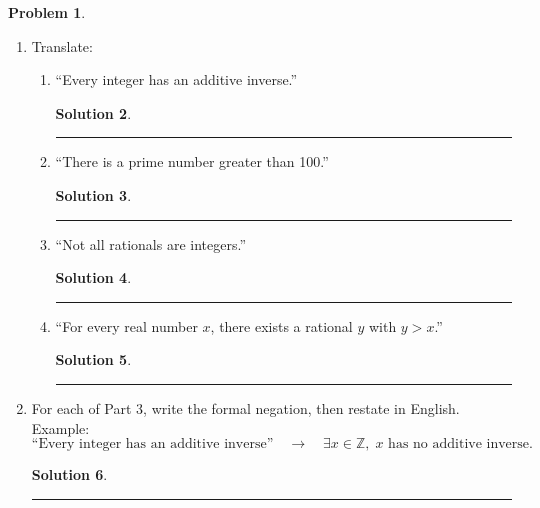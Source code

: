 \documentclass{article}
\theoremstyle{definition}
\newtheorem{problem}{Problem}
\def\fline{\rule{0.75\linewidth}{0.5pt}}
\newcommand{\finishline}{\begin{center}\fline\end{center}}
\newtheorem*{solution*}{Solution}
\newenvironment{solution}{\begin{solution*}}{{\finishline} \end{solution*}}
\begin{document}
\begin{problem}
\begin{enumerate}[label=(\alph*)]
\begin{enumerate}
  \begin{solution}



  \end{solution}
\end{enumerate}

\item Translate:

\begin{enumerate}
  \item ``Every integer has an additive inverse.''

  \begin{solution}



  \end{solution}
  \item ``There is a prime number greater than 100.''

  \begin{solution}



  \end{solution}
  \item ``Not all rationals are integers.''

  \begin{solution}



  \end{solution}
  \item ``For every real number $x$, there exists a rational $y$ with $y>x$.'' 

  \begin{solution}



  \end{solution}
\end{enumerate}

\item For each of Part 3, write the formal negation, then restate in English.  
Example:  
\[
\text{``Every integer has an additive inverse''} \quad \longrightarrow \quad \exists x \in \mathbb{Z}, \; \text{$x$ has no additive inverse.}
\]

\begin{solution}



\end{solution}
\end{enumerate}





\end{problem}
\end{document}
